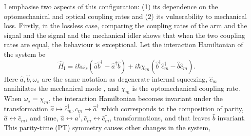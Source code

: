 I emphasise two aspects of this configuration: (1) its dependence on the optomechanical and optical coupling rates and (2) its vulnerability to mechanical loss. %
Firstly, in the lossless case, comparing the coupling rates of the arm and the signal and the signal and the mechanical idler shows that when the two coupling rates are equal, the behaviour is exceptional.
Let the interaction Hamiltonian of the system be~\cite{} $$\hat{H}_\text{I}=i\hbar\omega_s(\hat{a}\hat{b}^\dag-\hat{a}^\dag\hat{b})+i\hbar\chi_m(\hat{b}^\dag\hat{c}_m^\dag-\hat{b}\hat{c}_m).$$ Here $\hat a, \hat b, \omega_s$ are the same notation as degenerate internal squeezing, $\hat{c}_m$ annihilates the mechanical mode , and $\chi_m$ is the optomechanical coupling rate. When $\omega_s=\chi_m$, the interaction Hamiltonian becomes invariant under the transformation $\hat a\mapsto\hat{c}_m^\dag, \hat{c}_m\mapsto\hat a^\dag$ which corresponds to the composition of parity, $\hat a\leftrightarrow \hat{c}_m$, and time, $\hat a\leftrightarrow \hat a^\dag,\hat {c}_m\leftrightarrow \hat {c}_m^\dag$, transformations, and that leaves $\hat b$ invariant. This parity-time (PT) symmetry causes other changes in the system, 
